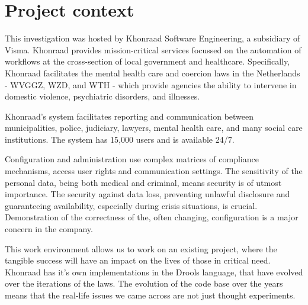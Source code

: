 \section{Project context}

This investigation was hosted by Khonraad Software Engineering, a subsidiary of Visma.
Khonraad provides mission-critical services focussed on the automation of workflows at the cross-section of local government and healthcare.
Specifically, Khonraad facilitates the mental health care and coercion laws in the Netherlands - WVGGZ, WZD, and WTH - which provide agencies the ability to intervene in domestic violence, psychiatric disorders, and illnesses.

Khonraad's system facilitates reporting and communication between municipalities, police, judiciary, lawyers, mental health care, and many social care institutions.
The system has 15,000 users and is available 24/7.

Configuration and administration use complex matrices of compliance mechanisms, access user rights and communication settings.
The sensitivity of the personal data, being both medical and criminal, means security is of utmost importance.
The security against data loss, preventing unlawful disclosure and guaranteeing availability, especially during crisis situations, is crucial.
Demonstration of the correctness of the, often changing, configuration is a major concern in the company.

This work environment allows us to work on an existing project, where the tangible success will have an impact on the lives of those in critical need.
Khonraad has it's own implementations in the Drools language, that have evolved over the iterations of the laws.
The evolution of the code base over the years means that the real-life issues we came across are not just thought experiments.